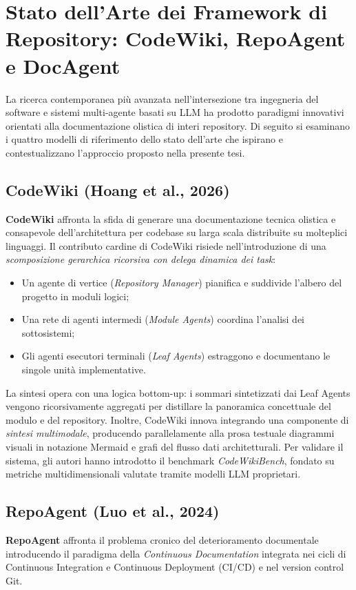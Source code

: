 \section{Stato dell'Arte dei Framework di Repository: CodeWiki, RepoAgent e DocAgent}
\label{sec:intro_sota_frameworks}

La ricerca contemporanea più avanzata nell'intersezione tra ingegneria del software e sistemi multi-agente basati su LLM ha prodotto paradigmi innovativi orientati alla documentazione olistica di interi repository. Di seguito si esaminano i quattro modelli di riferimento dello stato dell'arte che ispirano e contestualizzano l'approccio proposto nella presente tesi.

\subsection{CodeWiki (Hoang et al., 2026)}
\label{subsec:codewiki}
\textbf{CodeWiki} \cite{hoang_codewiki_2026} affronta la sfida di generare una documentazione tecnica olistica e consapevole dell'architettura per codebase su larga scala distribuite su molteplici linguaggi. Il contributo cardine di CodeWiki risiede nell'introduzione di una \emph{scomposizione gerarchica ricorsiva con delega dinamica dei task}:
\begin{itemize}[leftmargin=*, label=\textbullet]
    \item Un agente di vertice (\emph{Repository Manager}) pianifica e suddivide l'albero del progetto in moduli logici;
    \item Una rete di agenti intermedi (\emph{Module Agents}) coordina l'analisi dei sottosistemi;
    \item Gli agenti esecutori terminali (\emph{Leaf Agents}) estraggono e documentano le singole unità implementative.
\end{itemize}
La sintesi opera con una logica bottom-up: i sommari sintetizzati dai Leaf Agents vengono ricorsivamente aggregati per distillare la panoramica concettuale del modulo e del repository. Inoltre, CodeWiki innova integrando una componente di \emph{sintesi multimodale}, producendo parallelamente alla prosa testuale diagrammi visuali in notazione Mermaid e grafi del flusso dati architetturali. Per validare il sistema, gli autori hanno introdotto il benchmark \emph{CodeWikiBench}, fondato su metriche multidimensionali valutate tramite modelli LLM proprietari.

\subsection{RepoAgent (Luo et al., 2024)}
\label{subsec:repoagent}
\textbf{RepoAgent} \cite{luo_repoagent_2024} affronta il problema cronico del deterioramento documentale introducendo il paradigma della \emph{Continuous Documentation} integrata nei cicli di Continuous Integration e Continuous Deployment (CI/CD) e nel version control Git.

